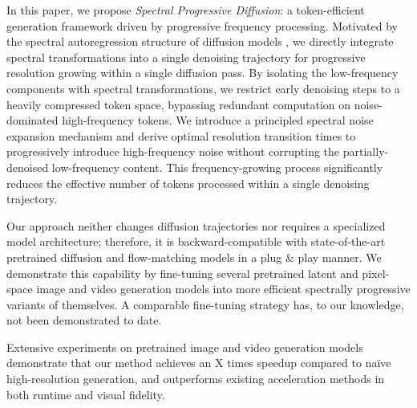 \iffalse
In this paper, we propose \emph{Spectral Progressive Diffusion}: a token-efficient generation framework driven by progressive frequency processing. Motivated by the spectral autoregression structure of diffusion models \cite{fourierspace, dieleman2024spectral}, we directly integrate spectral transformations into a single denoising trajectory for progressive resolution growing within a single diffusion pass. By isolating the low-frequency components with spectral transformations, we restrict early denoising steps to a heavily compressed token space, bypassing redundant computation on noise-dominated high-frequency tokens. We introduce a principled spectral noise expansion mechanism and derive optimal resolution transition times to progressively introduce high-frequency noise without corrupting the partially-denoised low-frequency content. This frequency-growing process significantly reduces the effective number of tokens processed within a single denoising trajectory. %

Our approach neither changes diffusion trajectories nor requires a specialized model architecture; therefore, it is backward-compatible with state-of-the-art pretrained diffusion and flow-matching models in a plug \& play manner. We demonstrate this capability by fine-tuning several pretrained latent and pixel-space image and video generation models into more efficient spectrally progressive variants of themselves. A comparable fine-tuning strategy has, to our knowledge, not been demonstrated to date. 

Extensive experiments on pretrained image and video generation models demonstrate that our method achieves an X times speedup compared to na\"ive high-resolution generation, and outperforms existing acceleration methods in both runtime and visual fidelity. 





